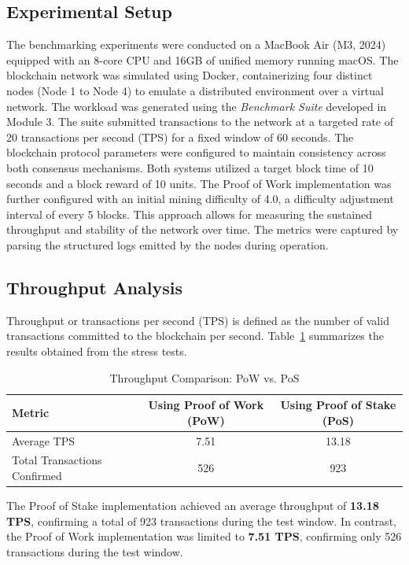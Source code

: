 \subsection{Experimental Setup}
The benchmarking experiments were conducted on a MacBook Air (M3, 2024) equipped with an 8-core CPU and 16GB of unified memory running macOS. The blockchain network was simulated using Docker, containerizing four distinct nodes (Node 1 to Node 4) to emulate a distributed environment over a virtual network. The workload was generated using the \textit{Benchmark Suite} developed in Module 3. The suite submitted transactions to the network at a targeted rate of 20 transactions per second (TPS) for a fixed window of 60 seconds. The blockchain protocol parameters were configured to maintain consistency across both consensus mechanisms. Both systems utilized a target block time of 10 seconds and a block reward of 10 units. The Proof of Work implementation was further configured with an initial mining difficulty of 4.0, a difficulty adjustment interval of every 5 blocks. This approach allows for measuring the sustained throughput and stability of the network over time. The metrics were captured by parsing the structured logs emitted by the nodes during operation.

\subsection{Throughput Analysis}
Throughput or transactions per second (TPS) is defined as the number of valid transactions committed to the blockchain per second. Table~\ref{tab:tps_comparison} summarizes the results obtained from the stress tests.

\begin{table}[h]
    \centering
    \begin{tabular}{|l|c|c|}
        \hline
        \textbf{Metric} & \textbf{Using Proof of Work (PoW)} & \textbf{Using Proof of Stake (PoS)} \\
        \hline
        Average TPS & 7.51 & 13.18 \\
        \hline
        Total Transactions Confirmed & 526 & 923 \\
        \hline
    \end{tabular}
    \caption{Throughput Comparison: PoW vs. PoS}
    \label{tab:tps_comparison}
\end{table}

The Proof of Stake implementation achieved an average throughput of \textbf{13.18 TPS}, confirming a total of 923 transactions during the test window. In contrast, the Proof of Work implementation was limited to \textbf{7.51 TPS}, confirming only 526 transactions during the test window.


